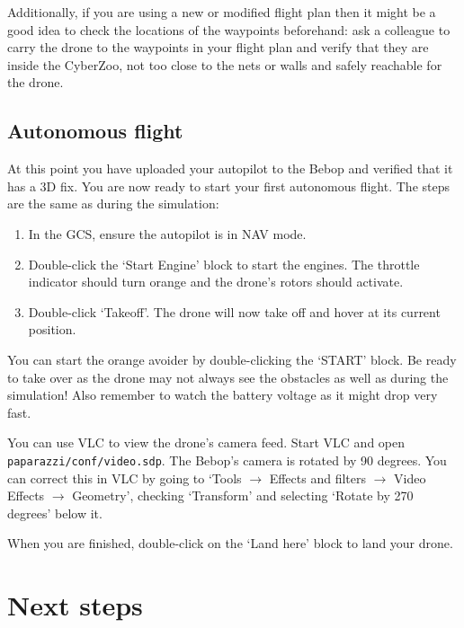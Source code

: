 \documentclass{article}
\begin{document}
Additionally, if you are using a new or modified flight plan then it might be a good idea to check the locations of the waypoints beforehand: ask a colleague to carry the drone to the waypoints in your flight plan and verify that they are inside the CyberZoo, not too close to the nets or walls and safely reachable for the drone.



\subsection*{Autonomous flight}
At this point you have uploaded your autopilot to the Bebop and verified that it has a 3D fix.
You are now ready to start your first autonomous flight.
The steps are the same as during the simulation:
\begin{enumerate}
\item In the GCS, ensure the autopilot is in NAV mode.
\item Double-click the `Start Engine' block to start the engines. The throttle indicator should turn orange and the drone's rotors should activate.
\item Double-click `Takeoff'. The drone will now take off and hover at its current position.
\end{enumerate}
You can start the orange avoider by double-clicking the `START' block. Be ready to take over as the drone may not always see the obstacles as well as during the simulation! Also remember to watch the battery voltage as it might drop very fast.


You can use VLC to view the drone's camera feed. Start VLC and open \verb"paparazzi/conf/video.sdp".
The Bebop's camera is rotated by 90 degrees. You can correct this in VLC by going to `Tools $\rightarrow$ Effects and filters $\rightarrow$ Video Effects $\rightarrow$ Geometry', checking `Transform' and selecting `Rotate by 270 degrees' below it.


When you are finished, double-click on the `Land here' block to land your drone.



\section{Next steps}
\end{document}
